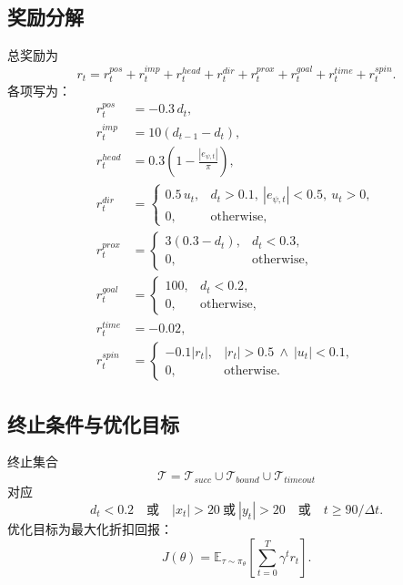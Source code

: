 \documentclass[11pt]{article}
\begin{document}
\subsection*{奖励分解}
总奖励为
\begin{equation}
r_t=r_t^{pos}+r_t^{imp}+r_t^{head}+r_t^{dir}+r_t^{prox}+r_t^{goal}+r_t^{time}+r_t^{spin}.
\end{equation}
各项写为：
\begin{align}
r_t^{pos} &= -0.3\,d_t,\\
r_t^{imp} &= 10(d_{t-1}-d_t),\\
r_t^{head} &= 0.3\left(1-\frac{|e_{\psi,t}|}{\pi}\right),\\
r_t^{dir} &=
\begin{cases}
0.5\,u_t, & d_t>0.1,\ |e_{\psi,t}|<0.5,\ u_t>0,\\
0, & \text{otherwise},
\end{cases}\\
r_t^{prox} &=
\begin{cases}
3(0.3-d_t), & d_t<0.3,\\
0, & \text{otherwise},
\end{cases}\\
r_t^{goal} &=
\begin{cases}
100, & d_t<0.2,\\
0, & \text{otherwise},
\end{cases}\\
r_t^{time} &= -0.02,\\
r_t^{spin} &=
\begin{cases}
-0.1|r_t|, & |r_t|>0.5\ \land\ |u_t|<0.1,\\
0, & \text{otherwise}.
\end{cases}
\end{align}

\subsection*{终止条件与优化目标}
终止集合
\begin{equation}
\mathcal{T}=\mathcal{T}_{succ}\cup\mathcal{T}_{bound}\cup\mathcal{T}_{timeout}
\end{equation}
对应
\begin{equation}
d_t<0.2\quad\text{或}\quad |x_t|>20\ \text{或}\ |y_t|>20\quad\text{或}\quad t\ge 90/\Delta t.
\end{equation}
优化目标为最大化折扣回报：
\begin{equation}
J(\theta)=\mathbb{E}_{\tau\sim\pi_\theta}\left[\sum_{t=0}^{T}\gamma^t r_t\right].
\end{equation}
\end{document}
